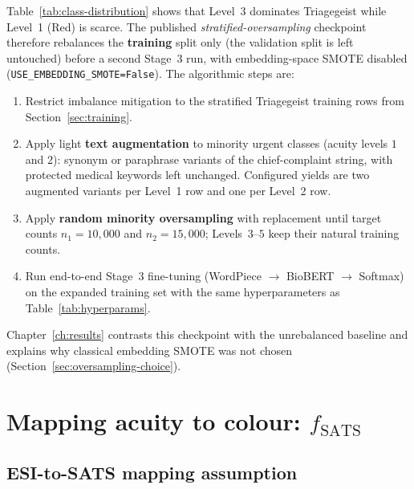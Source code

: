 Table~\ref{tab:class-distribution} shows that Level~3 dominates Triagegeist while Level~1 (Red) is scarce. The published \emph{stratified-oversampling} checkpoint therefore rebalances the \textbf{training} split only (the validation split is left untouched) before a second Stage~3 run, with embedding-space SMOTE disabled (\texttt{USE\_EMBEDDING\_SMOTE=False}). The algorithmic steps are:

\begin{enumerate}
\item Restrict imbalance mitigation to the stratified Triagegeist training rows from Section~\ref{sec:training}.
\item Apply light \textbf{text augmentation} to minority urgent classes (acuity levels \(1\) and \(2\)): synonym or paraphrase variants of the chief-complaint string, with protected medical keywords left unchanged. Configured yields are two augmented variants per Level~1 row and one per Level~2 row.
\item Apply \textbf{random minority oversampling} with replacement until target counts \(n_1 = 10{,}000\) and \(n_2 = 15{,}000\); Levels~$3$--$5$ keep their natural training counts.
\item Run end-to-end Stage~3 fine-tuning (WordPiece \(\rightarrow\) BioBERT \(\rightarrow\) Softmax) on the expanded training set with the same hyperparameters as Table~\ref{tab:hyperparams}.
\end{enumerate}

Chapter~\ref{ch:results} contrasts this checkpoint with the unrebalanced baseline and explains why classical embedding SMOTE was not chosen (Section~\ref{sec:oversampling-choice}).

\section{Mapping acuity to colour: \(f_{\mathrm{SATS}}\)}
\label{sec:fsats}

\subsection{ESI-to-SATS mapping assumption}

